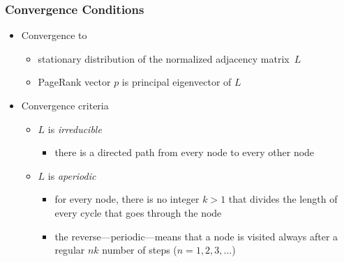\documentclass{beamer}
\begin{document}
\begin{frame}
  \frametitle{Convergence Conditions}

  \begin{itemize}
  \item Convergence to
    \begin{itemize}
    \item stationary distribution of the normalized adjacency matrix~$L$
    \item PageRank vector $p$ is principal eigenvector of $L$
    \end{itemize}
  \item Convergence criteria
    \begin{itemize}
    \item $L$ is \emph{irreducible}
      \begin{itemize}
      \item there is a directed path from every node to every other node
      \end{itemize}
  \item $L$ is \emph{aperiodic}
      \begin{itemize}
      \item for every node, there is no integer $k > 1$ that divides the length
          of every cycle that goes through the node
      \item the reverse---periodic---means that a node is visited always after
          a regular $nk$ number of steps ($n = 1, 2, 3, \ldots$)
      \end{itemize}
    \end{itemize}
  \end{itemize}

\end{frame}


\end{document}
